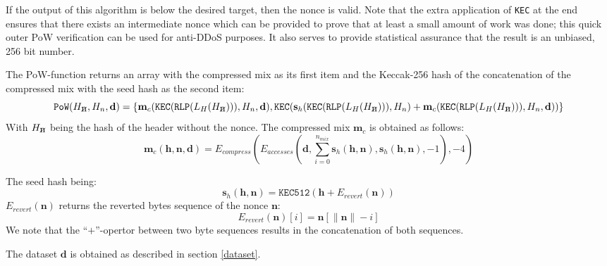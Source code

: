 \documentclass[9pt,oneside]{amsart}
\newcommand{\hcancel}[1]{%
    \tikz[baseline=(tocancel.base)]{
        \node[inner sep=0pt,outer sep=0pt] (tocancel) {#1};
        \draw[black] (tocancel.south west) -- (tocancel.north east);
    }%
}%
\begin{document}
If the output of this algorithm is below the desired target, then the nonce is valid. Note that the extra application of \texttt{KEC} at the end ensures that there exists an intermediate nonce which can be provided to prove that at least a small amount of work was done; this quick outer PoW verification can be used for anti-DDoS purposes. It also serves to provide statistical assurance that the result is an unbiased, 256 bit number.

The PoW-function returns an array with the compressed mix as its first item and the Keccak-256 hash of the concatenation of the compressed mix with the seed hash as the second item:
\begin{equation}
 \mathtt{PoW}(H_{\hcancel{n}}, H_n, \mathbf{d}) = \lbrace \mathbf{m}_c(\mathtt{\small KEC}(\mathtt{\small RLP}(L_H(H_{\hcancel{n}}))), H_n, \mathbf{d}), \texttt{KEC}(\mathbf{s}_h(\mathtt{\small KEC}(\mathtt{\small RLP}(L_H(H_{\hcancel{n}}))), H_n) + \mathbf{m}_c(\mathtt{\small KEC}(\mathtt{\small RLP}(L_H(H_{\hcancel{n}}))), H_n, \mathbf{d})) \rbrace
\end{equation}
With $H_{\hcancel{n}}$ being the hash of the header without the nonce. The compressed mix $\mathbf{m}_c$ is obtained as follows:
\begin{equation}
 \mathbf{m}_c(\mathbf{h}, \mathbf{n}, \mathbf{d}) = E_{compress}(E_{accesses}(\mathbf{d}, \sum_{i = 0}^{n_{mix}} \mathbf{s}_h(\mathbf{h}, \mathbf{n}), \mathbf{s}_h(\mathbf{h}, \mathbf{n}), -1), -4)
\end{equation}

The seed hash being:
\begin{equation}
 \mathbf{s}_h(\mathbf{h}, \mathbf{n}) = \texttt{KEC512}(\mathbf{h} + E_{revert}(\mathbf{n}))
\end{equation}
$E_{revert}(\mathbf{n})$ returns the reverted bytes sequence of the nonce $\mathbf{n}$:
\begin{equation}
 E_{revert}(\mathbf{n})[i] = \mathbf{n}[\lVert \mathbf{n} \rVert -i]
\end{equation}
We note that the ``$+$''-opertor between two byte sequences results in the concatenation of both sequences.

The dataset $\mathbf{d}$ is obtained as described in section \ref{dataset}.
\end{document}
